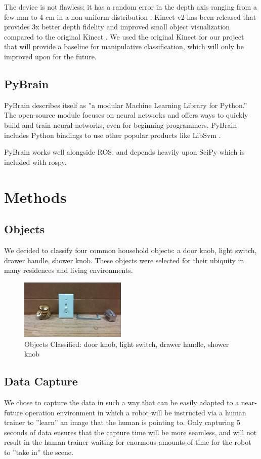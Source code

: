\documentclass{article}
\begin{document}
The device is not flawless; it has a random error in the depth axis 
ranging from a few mm to 4 cm in a non-uniform distribution \cite{khoshelham2012accuracy,nguyen2012modeling}.
Kinect v2 has been released that provides 3x better depth fidelity and improved small object visualization compared to 
the original Kinect \cite{kinect}. We used the original Kinect for our project that will provide a baseline for manipulative classification, which will only be improved upon for the future.

\subsection{PyBrain}
PyBrain describes itself as ''a modular Machine Learning Library for Python.'' The open-source module focuses on neural networks and offers ways to quickly build and train neural networks, even for beginning programmers. PyBrain includes Python bindings to use other popular products like LibSvm \cite{pybrain, pybrainCode}.  

PyBrain works well alongside ROS, and depends heavily upon SciPy which is included with rospy.

\section{Methods}
\subsection{Objects}
We decided to classify four common household objects: a door knob, light switch, drawer handle, shower knob. These objects were selected
for their ubiquity in many residences and living environments. 

\begin{figure}[h!]
    \centering
    \includegraphics[width=0.45\textwidth]{All_Knobs.jpg}
    \caption{Objects Classified: door knob, light switch, drawer handle, shower knob}
    \label{fig:objects}
\end{figure}

\subsection{Data Capture}
We chose to capture the data in such a way that can be easily adapted to a near-future operation environment in which a robot will be instructed via a human trainer to ''learn'' an image that the human is pointing to.  Only capturing 5 seconds of data ensures that the capture time will be more seamless, and will not result in the human trainer waiting for enormous amounts of time for the robot to ''take in'' the scene.  
\end{document}
